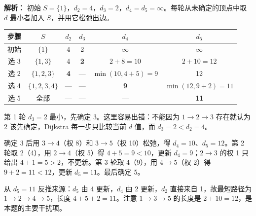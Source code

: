 \begin{enumerate}
\begin{center}
\end{center}

\ifshowsolutions\par\noindent\textbf{解析：} 初始 $S=\{1\}$，$d_2=4$，$d_3=2$，$d_4=d_5=\infty$。每轮从未确定的顶点中取 $d$ 最小者加入 $S$，并用它松弛出边。

\begin{center}
\small
\begin{tabular}{|c|c|c|c|c|c|}
\hline
步骤 & $S$ & $d_2$ & $d_3$ & $d_4$ & $d_5$ \\
\hline
初始 & $\{1\}$ & 4 & 2 & $\infty$ & $\infty$ \\
选 3 & $\{1,3\}$ & 4 & \textbf{2} & $2+8=10$ & $2+10=12$ \\
选 2 & $\{1,2,3\}$ & \textbf{4} & — & $\min(10,4+5)=9$ & 12 \\
选 4 & $\{1,2,3,4\}$ & — & — & \textbf{9} & $\min(12,9+2)=11$ \\
选 5 & 全部 & — & — & — & \textbf{11} \\
\hline
\end{tabular}
\end{center}

第 1 轮 $d_3=2$ 最小，先确定 3。这里容易出错：不能因为 $1\to2\to3$ 存在就认为 2 该先确定，Dijkstra 每一步只比较当前 $d$ 值，而 $d_3=2<d_2=4$。

确定 3 后用 $3\to4$（权 8）和 $3\to5$（权 10）松弛，得 $d_4=10$、$d_5=12$。第 2 轮取 2（4），用 $2\to4$（权 5）得 $4+5=9<10$，更新 $d_4=9$；$2\to3$ 的权 1 只给出 $4+1=5>2$，不更新。第 3 轮取 4（9），用 $4\to5$（权 2）得 $9+2=11<12$，更新 $d_5=11$。最后确定 5。

从 $d_5=11$ 反推来源：$d_5$ 由 4 更新，$d_4$ 由 2 更新，$d_2$ 直接来自 1，故最短路径为 $1\to2\to4\to5$，长度 $4+5+2=11$。注意 $1\to3\to5$ 的长度是 $2+10=12$，是本题的主要干扰项。


\end{enumerate}
